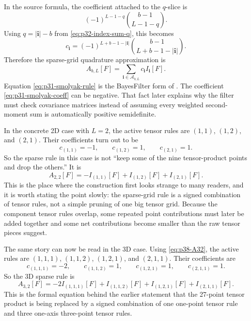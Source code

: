 \documentclass[11pt]{article}
\numberwithin{equation}{section}
\begin{document}
In the source formula, the coefficient attached to the \(q\)-slice is
\[
  (-1)^{L-1-q}\binom{b-1}{L-1-q}.
\]
Using \(q=|\mathbf i|-b\) from \eqref{eq:p32-index-sum-q}, this becomes
\begin{equation}
  c_{\mathbf i}
  =
  (-1)^{L+b-1-|\mathbf i|}
  \binom{b-1}{L+b-1-|\mathbf i|}.
  \label{eq:p31-smolyak-coeff}
\end{equation}
Therefore the sparse-grid quadrature approximation is
\begin{equation}
  A_{b,L}[F]
  =
  \sum_{\mathbf i\in\mathcal A_{b,L}}
  c_{\mathbf i}I_{\mathbf i}[F].
  \label{eq:p31-smolyak-rule}
\end{equation}
Equation \eqref{eq:p31-smolyak-rule} is the BayesFilter form of
\citet[Eq. 26--29]{jia2012sparsegrid}.  The coefficient
\eqref{eq:p31-smolyak-coeff} can be negative.  That fact later explains why
the filter must check covariance matrices instead of assuming every weighted
second-moment sum is automatically positive semidefinite.

In the concrete 2D case with \(L=2\), the active tensor rules are
\((1,1)\), \((1,2)\), and \((2,1)\).  Their coefficients turn out to be
\begin{equation}
  c_{(1,1)}=-1,
  \qquad
  c_{(1,2)}=1,
  \qquad
  c_{(2,1)}=1.
  \label{eq:p36-2d-smolyak-coeffs}
\end{equation}
So the sparse rule in this case is not ``keep some of the nine tensor-product
points and drop the others.''  It is
\begin{equation}
  A_{2,2}[F] = -I_{(1,1)}[F] + I_{(1,2)}[F] + I_{(2,1)}[F].
  \label{eq:p36-2d-smolyak-rule}
\end{equation}
This is the place where the construction first looks strange to many readers,
and it is worth stating the point slowly: the sparse-grid rule is a signed
combination of tensor rules, not a simple pruning of one big tensor grid.
Because the component tensor rules overlap, some repeated point contributions
must later be added together and some net contributions become smaller than the
raw tensor pieces suggest.

The same story can now be read in the 3D case.  Using
\eqref{eq:p38-A32}, the active rules are
\((1,1,1)\), \((1,1,2)\), \((1,2,1)\), and \((2,1,1)\).  Their coefficients are
\begin{equation}
  c_{(1,1,1)}=-2,
  \qquad
  c_{(1,1,2)}=1,
  \qquad
  c_{(1,2,1)}=1,
  \qquad
  c_{(2,1,1)}=1.
  \label{eq:p38-3d-smolyak-coeffs-repeat}
\end{equation}
So the 3D sparse rule is
\begin{equation}
  A_{3,2}[F]
  =
  -2I_{(1,1,1)}[F]+I_{(1,1,2)}[F]+I_{(1,2,1)}[F]+I_{(2,1,1)}[F].
  \label{eq:p38-3d-smolyak-rule}
\end{equation}
This is the formal equation behind the earlier statement that the 27-point tensor
product is being replaced by a signed combination of one one-point tensor rule
and three one-axis three-point tensor rules.
\end{document}
